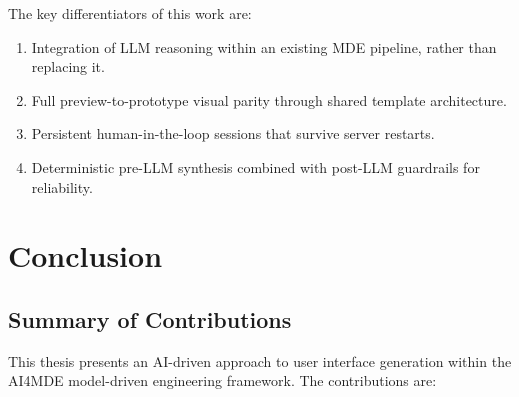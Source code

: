 The key differentiators of this work are:
\begin{enumerate}
    \item Integration of LLM reasoning within an existing MDE pipeline, rather than replacing it.
    \item Full preview-to-prototype visual parity through shared template architecture.
    \item Persistent human-in-the-loop sessions that survive server restarts.
    \item Deterministic pre-LLM synthesis combined with post-LLM guardrails for reliability.
\end{enumerate}



\section{Conclusion}

\subsection{Summary of Contributions}

This thesis presents an AI-driven approach to user interface generation within the AI4MDE model-driven engineering framework. The contributions are:


